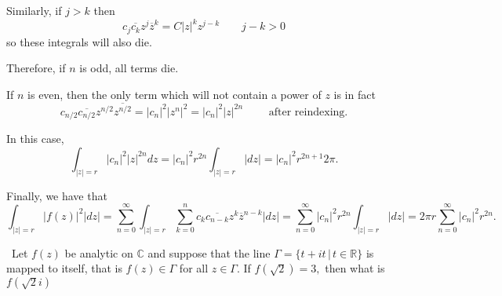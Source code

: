 \documentclass[12pt]{Qual}
\begin{document}
\begin{solution}
Similarly, if $j>k$ then $$c_j\overline{c_k}z^j\overline{z}^k=C|z|^kz^{j-k}\qquad j-k>0$$ so these integrals will also die.

Therefore, if $n$ is odd, all terms die.

If $n$ is even, then the only term which will not contain a power of $z$ is in fact $$c_{n/2}\overline{c_{n/2}}z^{n/2}\overline{z^{n/2}}=|c_n|^2|z^n|^2=|c_n|^2|z|^{2n}\qquad\text{ after reindexing}.$$

In this case, $$\int_{|z|=r}|c_n|^2|z|^{2n}dz=|c_n|^2r^{2n}\int_{|z|=r}|dz|=|c_n|^2r^{2n+1}2\pi.$$

Finally, we have that $$\int_{|z|=r}|f(z)|^2|dz|=\sum_{n=0}^\infty\int_{|z|=r}\sum_{k=0}^nc_k\overline{c_{n-k}}z^k\overline{z}^{n-k}|dz|=\sum_{n=0}^\infty|c_n|^2r^{2n}\int_{|z|=r}|dz|=2\pi r\sum_{n=0}^\infty|c_n|^2r^{2n}.$$
\end{solution}
\newpage

\begin{problem} $\,$
Let $f(z)$ be analytic on $\mathbb{C}$ and suppose that the line $\Gamma=\{t+it\,|\,t\in\mathbb{R}\}$ is mapped to itself, that is $f(z)\in\Gamma$ for all $z\in\Gamma$. If $f(\sqrt{2})=3,$ then what is $f(\sqrt{2}i)$
\end{problem}
\end{document}
